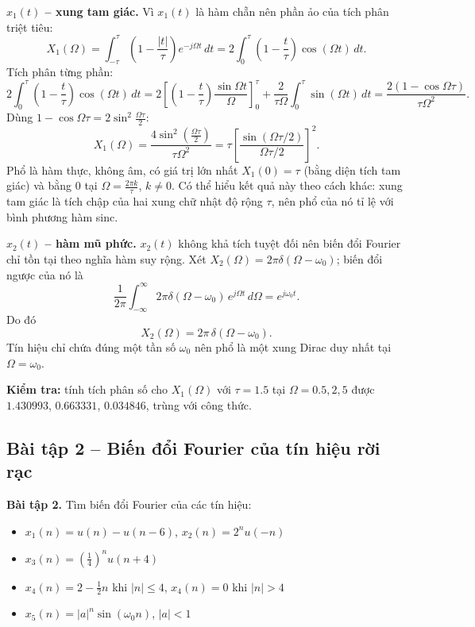 \documentclass[12pt,a4paper]{article}
\begin{document}
\textbf{$x_1(t)$ -- xung tam giác.} Vì $x_1(t)$ là hàm chẵn nên phần ảo của tích phân triệt tiêu:
\[
    X_1(\Omega) = \int_{-\tau}^{\tau} \left(1 - \frac{|t|}{\tau}\right) e^{-j\Omega t}\, dt
    = 2\int_{0}^{\tau} \left(1 - \frac{t}{\tau}\right) \cos(\Omega t)\, dt.
\]
Tích phân từng phần:
\[
    2\int_{0}^{\tau} \left(1 - \frac{t}{\tau}\right) \cos(\Omega t)\, dt
    = 2\left[\left(1 - \frac{t}{\tau}\right)\frac{\sin\Omega t}{\Omega}\right]_0^{\tau} + \frac{2}{\tau\Omega}\int_0^{\tau} \sin(\Omega t)\, dt
    = \frac{2\left(1 - \cos\Omega\tau\right)}{\tau\Omega^2}.
\]
Dùng $1 - \cos\Omega\tau = 2\sin^2\frac{\Omega\tau}{2}$:
\begin{equation}
    X_1(\Omega) = \frac{4\sin^2\left(\frac{\Omega\tau}{2}\right)}{\tau\Omega^2} = \tau \left[\frac{\sin\left(\Omega\tau/2\right)}{\Omega\tau/2}\right]^2.
\end{equation}
Phổ là hàm thực, không âm, có giá trị lớn nhất $X_1(0) = \tau$ (bằng diện tích tam giác) và bằng 0 tại $\Omega = \frac{2\pi k}{\tau}$, $k \ne 0$. Có thể hiểu kết quả này theo cách khác: xung tam giác là tích chập của hai xung chữ nhật độ rộng $\tau$, nên phổ của nó tỉ lệ với bình phương hàm sinc.

\textbf{$x_2(t)$ -- hàm mũ phức.} $x_2(t)$ không khả tích tuyệt đối nên biến đổi Fourier chỉ tồn tại theo nghĩa hàm suy rộng. Xét $X_2(\Omega) = 2\pi\delta(\Omega - \omega_0)$; biến đổi ngược của nó là
\[
    \frac{1}{2\pi}\int_{-\infty}^{\infty} 2\pi\delta(\Omega - \omega_0)\, e^{j\Omega t}\, d\Omega = e^{j\omega_0 t}.
\]
Do đó
\begin{equation}
    X_2(\Omega) = 2\pi\,\delta(\Omega - \omega_0).
\end{equation}
Tín hiệu chỉ chứa đúng một tần số $\omega_0$ nên phổ là một xung Dirac duy nhất tại $\Omega = \omega_0$.

\textbf{Kiểm tra:} tính tích phân số cho $X_1(\Omega)$ với $\tau = 1.5$ tại $\Omega = 0.5, 2, 5$ được $1.430993$, $0.663331$, $0.034846$, trùng với công thức.

\subsection{Bài tập 2 -- Biến đổi Fourier của tín hiệu rời rạc}
\begin{mdframed}[style=exbox]
\noindent\textbf{Bài tập 2.} Tìm biến đổi Fourier của các tín hiệu:
\begin{itemize}
    \item $x_1(n) = u(n) - u(n-6)$, \qquad $x_2(n) = 2^n u(-n)$
    \item[a.] $x_3(n) = \left(\frac{1}{4}\right)^n u(n+4)$
    \item[b.] $x_4(n) = 2 - \frac{1}{2}n$ khi $|n| \le 4$, \quad $x_4(n) = 0$ khi $|n| > 4$
    \item[c.] $x_5(n) = |a|^n \sin(\omega_0 n)$, \quad $|a| < 1$
\end{itemize}
\end{mdframed}
\end{document}
